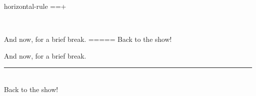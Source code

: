 \begin{identifier}{horizontal-rule}
==+
\end{identifier}
 \\



\begin{examples}
  \example{==}{\rule{0.5\textwidth}{1pt}}
  \begin{examplesource}
And now, for a brief break.
=====
Back to the show!
  \end{examplesource}
  \begin{exampleoutput}
    And now, for a brief break. \\
    \rule{0.5\textwidth}{1pt} \\
    Back to the show!
  \end{exampleoutput}
\end{examples}


